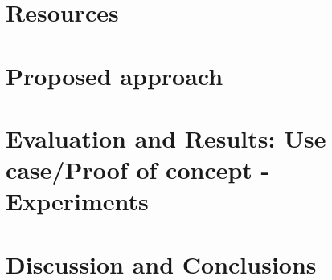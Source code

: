 \documentclass[runningheads]{llncs}
\begin{document}
\section{Resources}
\label{sec:resources}


\section{Proposed approach}
\label{sec:approach}



\section{Evaluation and Results: Use case/Proof of concept - Experiments}
\label{sec:evaluation}


\section{Discussion and Conclusions}
\label{sec:conclusions}






\printbibliography
\end{document}
